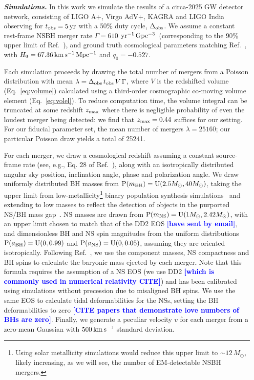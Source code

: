 \documentclass[%
 reprint,
 superscriptaddress,
 nofootinbib,
 amsmath,amssymb,
 aps,
]{revtex4-2}
\newcommand{\msun}{M_\odot}
\newcommand{\hubble}{\ensuremath{H_0}}
\newcommand{\decel}{\ensuremath{q_0}}
\newcommand{\zmax}{\ensuremath{z_{\rm max}}}
\newcommand{\prob}{\ensuremath{{\rm P}}}
\newcommand{\abh}{a_{\rm BH}}
\newcommand{\ans}{a_{\rm NS}}
\newcommand{\mbh}{m_{\rm BH}}
\newcommand{\mns}{m_{\rm NS}}
\newcommand{\uniform}{{\rm U}}
\newcommand{\tobs}{t_{\rm obs}}
\newcommand{\fobs}{\Delta_{\rm obs}}
\newcommand{\kmsmpc}{\ensuremath{{\rm km\,s^{-1}\,Mpc^{-1}}}}
\newcommand{\kms}{\ensuremath{{\rm km\,s^{-1}}}}
\newcommand{\yr}{\ensuremath{{\rm yr}}}
\newcommand{\yrgpc}{\ensuremath{{\rm yr^{-1}\,Gpc^{-3}}}}
\newcommand{\samayacomments}[1]{\textcolor{blue}{\bf [#1]}}
\begin{document}

\textbf{\emph{Simulations.}} In this work we simulate the results of a circa-2025 GW detector network, consisting of LIGO A+, Virgo AdV+, KAGRA and LIGO India~\cite{Abbott_etal:2013,LVCnoise} observing for $\tobs = 5\,\yr$ with a 50\% duty cycle, $\fobs$. We assume a constant rest-frame  NSBH merger rate $\Gamma = 610$ \yrgpc\ (corresponding to the 90\% upper limit of Ref.~\cite{Ligo:2018}), and ground truth cosmological parameters matching Ref.~\cite{Planck_VI:2018}, with $\hubble=67.36\,\kmsmpc$ and $\decel=-0.527$.

Each simulation proceeds by drawing the total number of mergers from a Poisson distribution with mean $\lambda = \fobs \, \tobs \, V \, \Gamma $, where $V$ is the redshifted volume (Eq.~\ref{eq:volume}) calculated using a third-order cosmographic co-moving volume element (Eq.~\ref{eq:volel}). To reduce computation time, the volume integral can be truncated at some redshift $\zmax$ where there is negligible probability of even the loudest merger being detected: we find that $\zmax=0.44$ suffices for our setting. For our fiducial parameter set, the mean number of mergers $\lambda = 25160$; our particular Poisson draw yields a total of 25241.

For each merger, we draw a cosmological redshift assuming a constant source-frame rate (see, e.g., Eq. 28 of Ref.~\cite{Mortlock_etal:2019}), along with an isotropically distributed angular sky position, inclination angle, phase and polarization angle. We draw uniformly distributed BH masses from $\prob(\mbh) = \uniform(2.5\msun, 40\msun)$, taking the upper limit from low-metallicity\footnote{Using solar metallicity simulations would reduce this upper limit to $\sim12\,\msun$, likely increasing, as we will see, the number of EM-detectable NSBH mergers.}
binary population synthesis simulations~\cite{Kruckow_etal:2018} and extending to low masses to reflect the detection of objects in the purported NS/BH mass gap~\cite{LVC:2020O3acat}. NS masses are drawn from $\prob(\mns) = \uniform(1\msun, 2.42\msun)$, with an upper limit chosen to match that of the DD2 EOS  \samayacomments{have sent by email}, and dimensionless BH and NS spin magnitudes from the uniform distributions $\prob(\abh) = \uniform(0, 0.99)$ and  $\prob(\ans) = \uniform(0, 0.05)$, assuming they are oriented isotropically. Following Ref.~\cite{Foucart_etal:2018}, we use the component masses, NS compactness and BH spins to calculate the baryonic mass ejected by each merger. Note that this formula requires the assumption of a NS EOS (we use DD2 \samayacomments{which is commonly used in numerical relativity CITE}) and has been calibrated using simulations without precession due to misaligned BH spins. We use the same EOS to calculate tidal deformabilities for the NSs, setting the BH deformabilities to zero \samayacomments{CITE papers that demonstrate love  numbers of BHs are zero}. Finally, we generate a peculiar velocity $v$ for each merger from a zero-mean Gaussian with $500\,\kms$ standard deviation.
\end{document}
